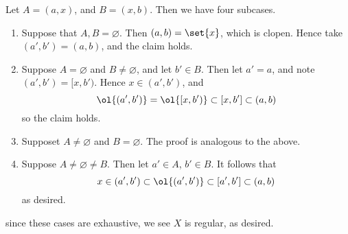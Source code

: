 \documentclass{fkpset}
\begin{document}
\begin{solution}
\begin{enumerate}[label=(\arabic*)]
        Let $A = (a, x)$, and $B = (x, b)$. Then we have four
        subcases.
        \begin{enumerate}[label=\roman*)]
          \item Suppose that $A,B = \varnothing$. Then $(a,b) =
            \set{x}$, which is clopen. Hence take $(a',b') = (a,b)$,
            and the claim holds. \cmark
          \item Suppose $A = \varnothing$ and $B \neq \varnothing$,
            and let $b' \in B$. Then let $a'=a$, and note $(a',b') =
            [x, b')$. Hence $x \in (a',b')$, and
            \[
              \ol{(a', b')} = \ol{[x, b')} \subset [x,b'] \subset
              (a,b)
            \]
            so the claim holds. \cmark
          \item Supposet $A \neq \varnothing$ and $B = \varnothing$.
            The proof is analogous to the above. \cmark
          \item Suppose $A \neq \varnothing \neq B$. Then let $a' \in
            A$, $b' \in B$. It follows that
            \[
              x \in (a',b') \subset \ol{(a',b')} \subset [a',b']
              \subset (a,b)
            \]
            as desired. \cmark
        \end{enumerate}
        since these cases are exhaustive, we see $X$ is regular, as
        desired.
    \end{enumerate}
  \end{solution}
  \clearpage
\end{document}
